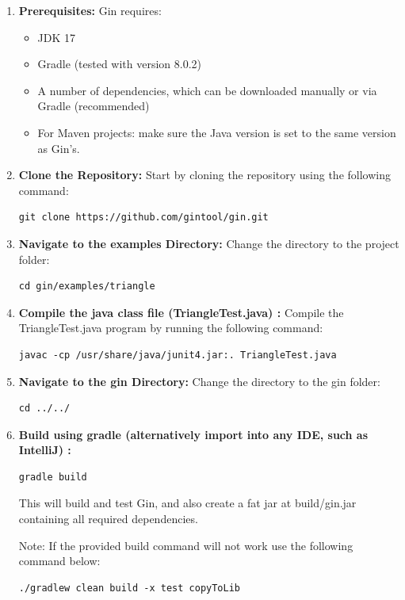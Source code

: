 \begin{enumerate}

\item \textbf{Prerequisites:} Gin requires:
\begin{itemize}
\item JDK 17
\item Gradle (tested with version 8.0.2)
\item A number of dependencies, which can be downloaded manually or via Gradle (recommended)
\item For Maven projects: make sure the Java version is set to the same version as Gin's.
\end{itemize}

\item \textbf{Clone the Repository:} Start by cloning the repository using the following command:

\begin{verbatim}
git clone https://github.com/gintool/gin.git
\end{verbatim}

\item \textbf{Navigate to the examples Directory:} Change the directory to the project folder:
\begin{verbatim}
cd gin/examples/triangle
\end{verbatim}

\item \textbf{Compile the java class file (\eg TriangleTest.java) :} Compile the TriangleTest.java program by running the following command:
\begin{verbatim}
javac -cp /usr/share/java/junit4.jar:. TriangleTest.java
\end{verbatim}

\item \textbf{Navigate to the gin Directory:} Change the directory to the gin folder:
\begin{verbatim}
cd ../../
\end{verbatim}

\item \textbf{Build using gradle (alternatively import into any IDE, such as IntelliJ) :}
\begin{verbatim}
gradle build
\end{verbatim}

This will build and test Gin, and also create a fat jar at build/gin.jar containing all required dependencies.

Note: If the provided build command will not work use the following command below:
\begin{verbatim}
./gradlew clean build -x test copyToLib
\end{verbatim}


\end{enumerate}
